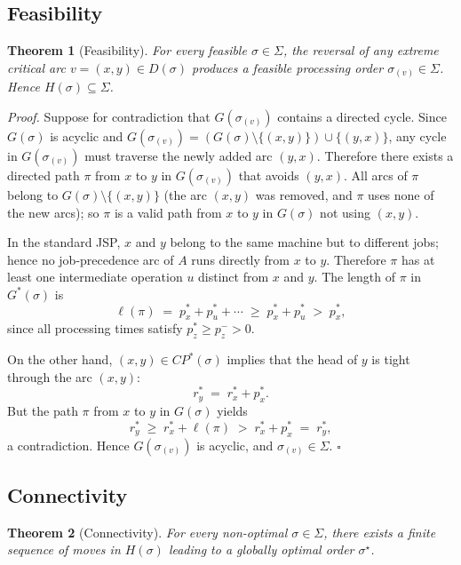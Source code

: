 \documentclass[preprint,12pt]{elsarticle}
\newtheorem{theorem}{Theorem}
\newenvironment{proof}%
  {\noindent\textit{Proof.}\enspace}%
  {\hfill$\square$\par\medskip}
\begin{document}
\subsection{Feasibility}
\label{sec4.3}

\begin{theorem}[Feasibility]
\label{thm1}
For every feasible $\sigma \in \Sigma$, the reversal of any extreme critical arc $v = (x,y) \in D(\sigma)$ produces a feasible processing order $\sigma_{(v)} \in \Sigma$. Hence $H(\sigma) \subseteq \Sigma$.
\end{theorem}

\begin{proof}
Suppose for contradiction that $G(\sigma_{(v)})$ contains a directed cycle.
Since $G(\sigma)$ is acyclic and $G(\sigma_{(v)})=(G(\sigma)\setminus\{(x,y)\})\cup\{(y,x)\}$,
any cycle in $G(\sigma_{(v)})$ must traverse the newly added arc $(y,x)$.
Therefore there exists a directed path $\pi$ from $x$ to $y$ in $G(\sigma_{(v)})$ that avoids $(y,x)$.
All arcs of $\pi$ belong to $G(\sigma)\setminus\{(x,y)\}$ (the arc $(x,y)$ was removed, and $\pi$ uses none of the new arcs); so $\pi$ is a valid path from $x$ to $y$ in $G(\sigma)$ not using $(x,y)$.

In the standard JSP, $x$ and $y$ belong to the same machine but to different jobs; hence no job-precedence arc of $A$ runs directly from $x$ to $y$.
Therefore $\pi$ has at least one intermediate operation $u$ distinct from $x$ and $y$.
The length of $\pi$ in $G^*(\sigma)$ is
\[
  \ell(\pi) \;=\; p_x^* + p_u^* + \cdots \;\ge\; p_x^* + p_u^* \;>\; p_x^*,
\]
since all processing times satisfy $p_z^*\ge p_z^->0$.

On the other hand, $(x,y)\in CP^*(\sigma)$ implies that the head of $y$ is tight through the arc $(x,y)$:
\[
  r_y^* \;=\; r_x^* + p_x^*.
\]
But the path $\pi$ from $x$ to $y$ in $G(\sigma)$ yields
\[
  r_y^* \;\ge\; r_x^* + \ell(\pi) \;>\; r_x^*+p_x^* \;=\; r_y^*,
\]
a contradiction.
Hence $G(\sigma_{(v)})$ is acyclic, and $\sigma_{(v)}\in\Sigma$.
\end{proof}

\subsection{Connectivity}
\label{sec4.4}

\begin{theorem}[Connectivity]
\label{thm2}
For every non-optimal $\sigma \in \Sigma$, there exists a finite sequence of moves in $H(\sigma)$ leading to a globally optimal order $\sigma^{\star}$.
\end{theorem}
\end{document}
